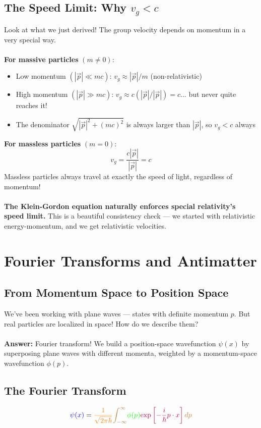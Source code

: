 \documentclass{report}
\begin{document}
\section{The Speed Limit: Why $v_g < c$}
Look at what we just derived! The group velocity depends on momentum in a very special way.\\
\\
\textbf{For massive particles} $(m \neq 0)$:
\begin{itemize}
	\item Low momentum $(|\vec{p}| \ll mc)$: $v_g \approx |\vec{p}|/m$ (non-relativistic)
	\item High momentum $(|\vec{p}| \gg mc)$: $v_g \approx c(|\vec{p}|/|\vec{p}|) = c$... but never quite reaches it!
	\item The denominator $\sqrt{|\vec{p}|^2 + (mc)^2}$ is always larger than $|\vec{p}|$, so $v_g < c$ always
\end{itemize}
\textbf{For massless particles} $(m = 0)$:
\begin{equation}
	v_g = \frac{c|\vec{p}|}{|\vec{p}|} = c
\end{equation}
Massless particles always travel at exactly the speed of light, regardless of momentum!\\
\\
\textbf{The Klein-Gordon equation naturally enforces special relativity's speed limit.} This is a beautiful consistency check --- we started with relativistic energy-momentum, and we get relativistic velocities.
\chapter{Fourier Transforms and Antimatter}
\section{From Momentum Space to Position Space}
We've been working with plane waves --- states with definite momentum $p$. But real particles are localized in space! How do we describe them?\\
\\
\textbf{Answer:} Fourier transform! We build a position-space wavefunction $\psi(x)$ by superposing plane waves with different momenta, weighted by a momentum-space wavefunction $\phi(p)$.

\section{The Fourier Transform}
\begin{equation}
	\textcolor{blue}{\psi(x)} = \textcolor{orange}{\frac{1}{\sqrt{2\pi \hbar}}} \textcolor{brown}{\int_{-\infty}^{\infty}} \textcolor{green}{\phi(p)} \textcolor{purple}{\text{exp}\left[-\frac{i}{\hbar}p \cdot x\right]} \, \textcolor{brown}{dp}
\end{equation}
\end{document}
